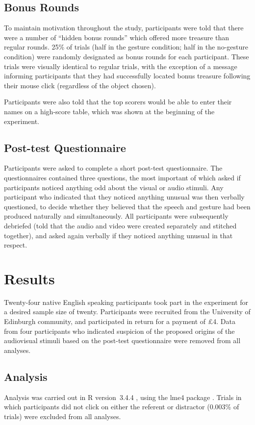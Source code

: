 \documentclass[a4paper,man,natbib]{apa6}
\begin{document}
\subsection{Bonus Rounds}
To maintain motivation throughout the study, participants were told that there were a number of ``hidden bonus rounds'' which offered more treasure than regular rounds.
25\% of trials (half in the gesture condition; half in the no-gesture condition) were randomly designated as bonus rounds for each participant.
These trials were visually identical to regular trials, with the exception of a message informing participants that they had successfully located bonus treasure following their mouse click (regardless of the object chosen).

Participants were also told that the top scorers would be able to enter their names on a high-score table, which was shown at the beginning of the experiment. 

\subsection{Post-test Questionnaire}
Participants were asked to complete a short post-test questionnaire. 
The questionnaires contained three questions, the most important of which asked if participants noticed anything odd about the visual or audio stimuli.
Any participant who indicated that they noticed anything unusual was then verbally questioned, to decide whether they believed that the speech and gesture had been produced naturally and simultaneously.
All participants were subsequently debriefed (told that the audio and video were created separately and stitched together), and asked again verbally if they noticed anything unusual in that respect. 

\section{Results}
Twenty-four native English speaking participants took part in the experiment for a desired sample size of twenty. 
Participants were recruited from the University of Edinburgh community, and participated in return for a payment of \pounds{}4.
Data from four participants who indicated suspicion of the proposed origins of the audiovisual stimuli based on the post-test questionnaire were removed from all analyses.

\subsection{Analysis}
Analysis was carried out in R version~3.4.4 \citep{Rbase2017}, using the lme4 package \citep{Bates2015}. 
Trials in which participants did not click on either the referent or distractor (0.003\% of trials) were excluded from all analyses. 
\end{document}
